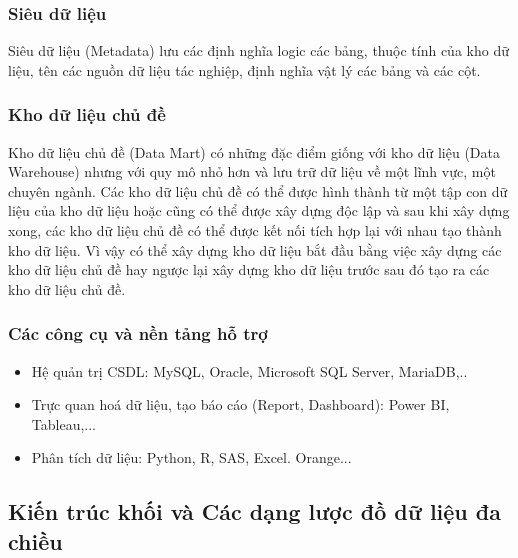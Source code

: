 \subsubsection{Siêu dữ liệu}
Siêu dữ liệu (Metadata) lưu các định nghĩa logic các bảng, thuộc tính của kho dữ liệu, tên các nguồn dữ liệu tác nghiệp, định nghĩa vật lý các bảng và các cột.
\subsubsection{Kho dữ liệu chủ đề}
Kho dữ liệu chủ đề (Data Mart) có những đặc điểm giống với kho dữ liệu (Data Warehouse) nhưng với quy mô nhỏ hơn và lưu trữ dữ liệu về một lĩnh vực, một chuyên ngành. Các kho dữ liệu chủ đề có thể được hình thành từ một tập con dữ liệu của kho dữ liệu hoặc cũng có thể được
xây dựng độc lập và sau khi xây dựng xong, các kho dữ liệu chủ đề có thể được kết nối tích hợp lại với nhau tạo thành kho dữ liệu. Vì vậy có thể xây dựng kho dữ liệu bắt đầu bằng việc xây dựng các kho dữ liệu chủ đề hay ngược lại xây dựng kho dữ liệu trước sau đó tạo ra các kho dữ
liệu chủ đề.
\subsubsection{Các công cụ và nền tảng hỗ trợ}
\begin{itemize}[label=$-$]
    \item Hệ quản trị CSDL: MySQL, Oracle, Microsoft SQL Server, MariaDB,..
    \item Trực quan hoá dữ liệu, tạo báo cáo (Report, Dashboard): Power BI, Tableau,...
    \item Phân tích dữ liệu: Python, R, SAS, Excel. Orange...
\end{itemize}
\subsection{Kiến trúc khối và Các dạng lược đồ dữ liệu đa chiều}
